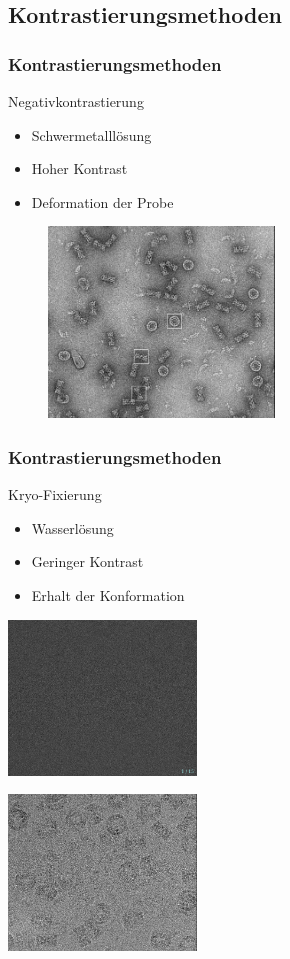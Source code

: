 \subsection{Kontrastierungsmethoden} %
\label{sub:subsection_name}

\begin{frame}
	\frametitle{Kontrastierungsmethoden}
	\begin{block}{Negativkontrastierung}
		\begin{itemize}
			\item Schwermetalllösung
			\item Hoher Kontrast			
			\item Deformation der Probe
		\end{itemize}
	\end{block}
	\begin{figure}
		\includegraphics[width = 6cm]{pic/stain.png}
	\end{figure}
\end{frame}
\begin{frame}
	\frametitle{Kontrastierungsmethoden}
	\begin{block}{Kryo-Fixierung}
		\begin{itemize}
			\item Wasserlösung
			\item Geringer Kontrast
			\item Erhalt der Konformation
		\end{itemize}
	\end{block}
	\centering
	\begin{minipage}{5cm}
		\includegraphics[width = 5cm]{pic/kryo2.png}
	\end{minipage}
	\begin{minipage}{5cm}
		\includegraphics[width = 5cm]{pic/kryo1.png}
	\end{minipage}
\end{frame}
